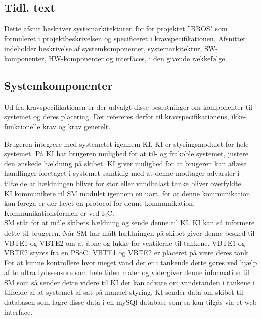 \subsection{Tidl. text}
Dette afsnit beskriver systemarkitekturen for for projektet ”BROS" som formuleret i projektbeskrivelsen og specificeret i kravspecifikationen.
Afsnittet indeholder beskrivelse af systemkomponenter, systemarkitektur, SW-komponenter, HW-komponenter og interfaces, i den givende rækkefølge.

\subsection{Systemkomponenter}
Ud fra kravspecifikationen er der udvalgt disse beslutninger om komponenter til systemet og deres placering. Der refereres derfor til kravspecifikationens, ikke-funktionelle krav og krav generelt.

Brugeren integrere med systemetet igennem KI. KI er styringsmodulet for hele systemet. På KI har brugeren mulighed for at til- og frakoble systemet, justere den ønskede hældning på skibet. KI giver mulighed for at brugeren kan aflæse handlinger foretaget i systemet samtidig med at denne modtager advarsler i tilfælde at hældningen bliver for stor eller vandbalast tanke bliver overfyldte.\\
KI kommunikere til SM modulet igennem en uart. for at denne kommunikation kan foregå er der lavet en protocol for denne kommunikation. Kommunikationsformen er ved I$_2$C.\\
SM står for at måle skibets hældning og sende denne til KI. KI kan så informere dette til brugeren. Når SM har målt hældningen på skibet giver denne besked til VBTE1 og VBTE2 om at åbne og lukke for ventilerne til tankene. VBTE1 og VBTE2 styres fra en PSoC. VBTE1 og VBTE2 er placeret på være deres tank. For at kunne kontrollere hvor meget vand der er i tankende dette gøres ved hjælp af to ultra lydssensore som hele tiden måler og vidergiver denne information til SM som så sender dette videre til KI der kan advare om vandstanden i tankene i tilfælde af at systemet af sat på manuel styring.
KI sender data om skibet til databasen som lagre disse data i en mySQl database som så kan tilgås via et web interface.